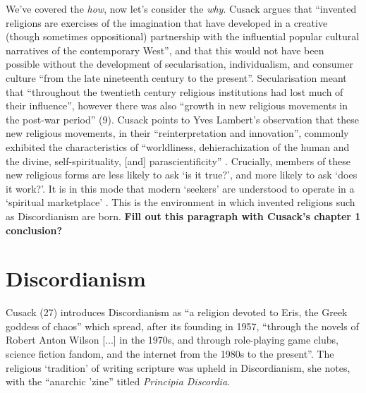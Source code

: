 \documentclass[Draft.tex]{subfiles}
\begin{document}
We've covered the \textit{how}, now let's consider the \textit{why}.
Cusack \parencite*[7]{Cusack10} argues that ``invented religions are
exercises of the imagination that have developed in a creative
(though sometimes oppositional) partnership with the influential
popular cultural narratives of the contemporary West'',
and that this would not have been possible without
the development of secularisation, individualism, and consumer culture
``from the late nineteenth century to the present''.
Secularisation meant that  ``throughout the twentieth century
religious institutions had lost much of their influence'',
however there was also ``growth in new religious movements
in the post-war period'' (9).
Cusack \parencite[9]{Cusack10} points to Yves Lambert's observation that
these new religious movements, in their ``reinterpretation and innovation'', 
commonly exhibited the characteristics of
``worldliness, dehierachization of the human and the divine,
self-spirituality, [and] parascientificity'' \parencite[303]{Lambert99}.
Crucially, members of these new religious forms are less likely to ask
`is it true?', and more likely to ask `does it work?'.
It is in this mode that modern `seekers' are understood to operate in
a `spiritual marketplace' \parencite[13]{Cusack10}.
This is the environment in which invented religions 
such as Discordianism are born.
\textbf{Fill out this paragraph with Cusack's chapter 1 conclusion?}

\section*{Discordianism}
Cusack (27) introduces Discordianism as 
``a religion devoted to Eris, the Greek goddess of chaos''
which spread, after its founding in 1957, ``through
the novels of Robert Anton Wilson [...] in the 1970s,
and through role-playing game clubs, science fiction fandom,
and the internet from the 1980s to the present''.
The religious `tradition' of writing scripture was upheld in Discordianism,
she notes, with the ``anarchic 'zine'' titled \textit{Principia Discordia}.


\end{document}
